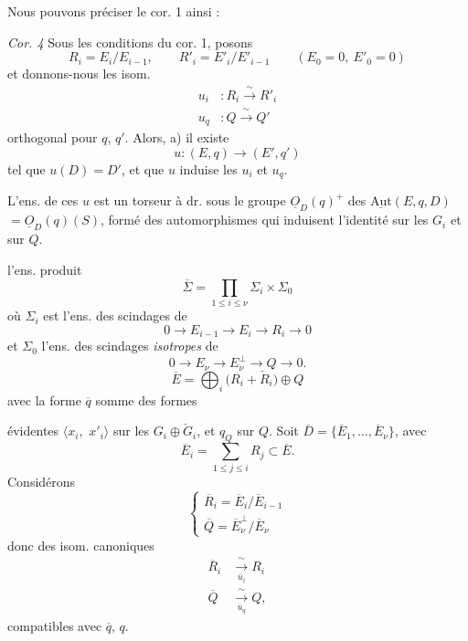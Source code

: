 \documentclass[11pt,a4paper]{article}
\begin{document}
Nous pouvons préciser le cor. 1 ainsi :

\emph{Cor. 4} Sous les conditions du cor. 1, posons
\[
R_i = E_i/E_{i-1},\qquad R'_i = E'_i/E'_{i-1}\qquad (E_0=0,\ E'_0=0)
\]
et donnons-nous les isom.
\[
\begin{aligned}
u_i &: R_i \xrightarrow{\ \sim\ } R'_i\\
u_q &: Q \xrightarrow{\ \sim\ } Q'
\end{aligned}
\]
 orthogonal pour $q$, $q'$. Alors,  
a) il existe 
\[
u : (E,q) \longrightarrow (E',q')
\]
tel que $u(D)=D'$, et que $u$ induise les $u_i$ et $u_q$.

 L'ens. de ces $u$ est  un torseur à dr.
sous le groupe $\underline{O}_D(q)^{+}$ des
 \add{$\subset$} $\underline{\mathrm{Aut}}(E,q,D)$
$= \underline{O}_D(q)(S)$, formé des automorphismes qui induisent l'identité sur
les $G_i$ et sur $Q$.

  l'ens.  produit
\[
\overline{\Sigma} = \prod_{1\le i\le\nu} \Sigma_i \times \Sigma_0
\]
où $\Sigma_i$ est l'ens. des scindages de
\[
0\longrightarrow E_{i-1} \longrightarrow E_i \longrightarrow R_i \longrightarrow 0
\]
et $\Sigma_0$ l'ens. des scindages \emph{isotropes} de
\[
0\longrightarrow E_\nu \longrightarrow E_\nu^{\perp} \longrightarrow Q \longrightarrow 0 .
\]
 \add{\ill{}}
\[
\overline{E} = \bigoplus_i \bigl(R_i + \check R_i\bigr) \oplus Q
\]
avec la forme $\overline{q}$ somme des formes

évidentes $\langle x_i,$  $x'_i\rangle$ sur les $G_i\oplus\check G_i$, et $q_Q$
sur $Q$.  Soit $\overline{D}=\{\overline{E}_1,\ldots,\overline{E}_\nu\}$,
avec
\[
\overline{E}_i = \sum_{1\le j\le i} R_j \subset \overline{E} .
\]
 Considérons
\[
\begin{cases}
\overline{R}_i = \overline{E}_i/\overline{E}_{i-1}\\
\overline{Q} = \overline{E}_\nu^{\perp}/\overline{E}_\nu
\end{cases}
\]
 donc des isom. canoniques
\[
\begin{aligned}
\overline{R}_i &\xrightarrow[\ \overline{u}_i\ ]{\ \sim\ } R_i\\
\overline{Q} &\xrightarrow[\ \overline{u}_q\ ]{\ \sim\ } Q ,
\end{aligned}
\]
  compatibles avec $\overline{q}$, $q$.
\end{document}
